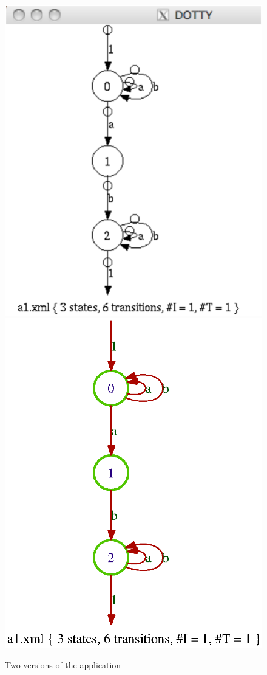 \begin{figure}[ht]
    \centering
\includegraphics[scale=0.25]{figures/a1-dotty.ps}
\ee
\includegraphics[scale=0.5]{figures/a1-gv.ps}
\caption{Two versions of the  application}
\label{fig:gra-viz}%
\end{figure}


